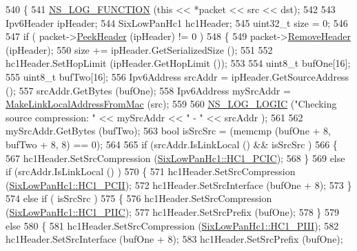 \begin{DoxyCode}
540 \{
541   \hyperlink{log-macros-disabled_8h_a90b90d5bad1f39cb1b64923ea94c0761}{NS\_LOG\_FUNCTION} (\textcolor{keyword}{this} << *packet << src << dst);
542 
543   Ipv6Header ipHeader;
544   SixLowPanHc1 hc1Header;
545   uint32\_t size = 0;
546 
547   \textcolor{keywordflow}{if} ( packet->\hyperlink{classns3_1_1Packet_aadc63487bea70945c418f4c3e9b81964}{PeekHeader} (ipHeader) != 0 )
548     \{
549       packet->\hyperlink{classns3_1_1Packet_a0961eccf975d75f902d40956c93ba63e}{RemoveHeader} (ipHeader);
550       size += ipHeader.GetSerializedSize ();
551 
552       hc1Header.SetHopLimit (ipHeader.GetHopLimit ());
553 
554       uint8\_t bufOne[16];
555       uint8\_t bufTwo[16];
556       Ipv6Address srcAddr = ipHeader.GetSourceAddress ();
557       srcAddr.GetBytes (bufOne);
558       Ipv6Address mySrcAddr = \hyperlink{classns3_1_1SixLowPanNetDevice_acf66b0ff019d0f1b88212d452044696e}{MakeLinkLocalAddressFromMac} (src);
559 
560       \hyperlink{group__logging_ga88acd260151caf2db9c0fc84997f45ce}{NS\_LOG\_LOGIC} (\textcolor{stringliteral}{"Checking source compression: "} << mySrcAddr << \textcolor{stringliteral}{" - "} << srcAddr );
561 
562       mySrcAddr.GetBytes (bufTwo);
563       \textcolor{keywordtype}{bool} isSrcSrc = (memcmp (bufOne + 8, bufTwo + 8, 8) == 0);
564 
565       \textcolor{keywordflow}{if} (srcAddr.IsLinkLocal () && isSrcSrc )
566         \{
567           hc1Header.SetSrcCompression (\hyperlink{classns3_1_1SixLowPanHc1_a29c864d9bf6bc466ee2214a95a83dcada2e3b9656c8f4d8912d0bf078533e298f}{SixLowPanHc1::HC1\_PCIC});
568         \}
569       \textcolor{keywordflow}{else} \textcolor{keywordflow}{if} (srcAddr.IsLinkLocal () )
570         \{
571           hc1Header.SetSrcCompression (\hyperlink{classns3_1_1SixLowPanHc1_a29c864d9bf6bc466ee2214a95a83dcada3b9d64b07cd392302c87ed69164f0793}{SixLowPanHc1::HC1\_PCII});
572           hc1Header.SetSrcInterface (bufOne + 8);
573         \}
574       \textcolor{keywordflow}{else} \textcolor{keywordflow}{if} ( isSrcSrc )
575         \{
576           hc1Header.SetSrcCompression (\hyperlink{classns3_1_1SixLowPanHc1_a29c864d9bf6bc466ee2214a95a83dcada8e07a41c91e304c47d01515d51d399ca}{SixLowPanHc1::HC1\_PIIC});
577           hc1Header.SetSrcPrefix (bufOne);
578         \}
579       \textcolor{keywordflow}{else}
580         \{
581           hc1Header.SetSrcCompression (\hyperlink{classns3_1_1SixLowPanHc1_a29c864d9bf6bc466ee2214a95a83dcada33fbbb35ed064759434a773a85d2d325}{SixLowPanHc1::HC1\_PIII});
582           hc1Header.SetSrcInterface (bufOne + 8);
583           hc1Header.SetSrcPrefix (bufOne);

\end{DoxyCode}
